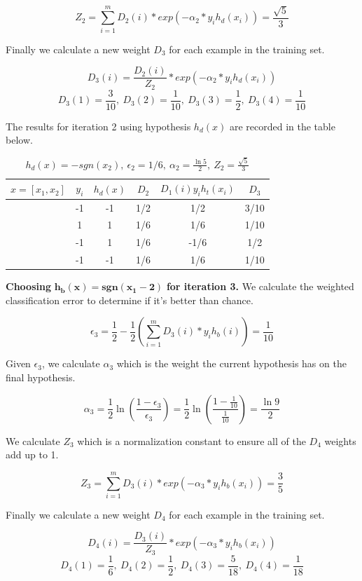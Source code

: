\documentclass[11pt]{article}
\begin{document}
$$Z_2 = \sum_{i = 1}^m D_2(i) * exp(-\alpha_2 * y_ih_d(x_i)) = \frac{\sqrt{5}}{3}$$

Finally we calculate a new weight $D_3$ for each example in the training set.

$$D_{3}(i) = \frac{D_2(i)}{Z_2} * exp(-\alpha_2 * y_ih_d(x_i))$$
$$D_3(1) = \frac{3}{10}, \ D_3(2) = \frac{1}{10}, \ D_3(3) = \frac{1}{2}, \ D_3(4) = \frac{1}{10} $$

The results for iteration 2 using hypothesis $h_d(x)$ are recorded in the table below.

\begin{table}[H]
\centering
{\renewcommand{\arraystretch}{1.2}%
\begin{tabular}{| c | c | c | c | c | c |}
\hline
$x = [x_1, x_2]$& $y_i$ & $h_d(x)$ & $D_2$ & $D_1(i)y_ih_t(x_i)$ & $D_3$\\
\hline
[1,1] & -1 & -1 & 1/2 &  1/2& 3/10\\ \hline
[1,-1] & 1 &  1&  1/6&  1/6& 1/10\\ \hline
[-1,-1] & -1 & 1 & 1/6&  -1/6& 1/2\\ \hline
[-1,1] & -1 & -1 &  1/6&  1/6& 1/10\\ \hline
\end{tabular}}
\caption{$h_d(x) = -sgn(x_2), \ \epsilon_2 = 1/6, \ \alpha_2 = \frac{\ln5}{2}, \ Z_2 = \frac{\sqrt{5}}{3}$}
\end{table}

\textbf{Choosing} $\mathbf{h_b(x) = sgn(x_1 - 2)}$ \textbf{for iteration 3.} We calculate the weighted classification error to determine if it's better than chance.

$$\epsilon_3 = \frac{1}{2} - \frac{1}{2}(\sum_{i=1}^m D_3(i)*y_ih_b(i)) = \frac{1}{10}$$

Given $\epsilon_3$, we calculate $\alpha_3$ which is the weight the current hypothesis has on the final hypothesis.

$$\alpha_3 = \frac{1}{2}\ln(\frac{1 - \epsilon_3}{\epsilon_3}) = \frac{1}{2}\ln(\frac{1 - \frac{1}{10}}{\frac{1}{10}}) = \frac{\ln9}{2}$$

We calculate $Z_3$ which is a normalization constant to ensure all of the $D_4$ weights add up to 1.

$$Z_3 = \sum_{i = 1}^m D_3(i) * exp(-\alpha_3 * y_ih_b(x_i)) = \frac{3}{5}$$

Finally we calculate a new weight $D_4$ for each example in the training set.

$$D_{4}(i) = \frac{D_3(i)}{Z_3} * exp(-\alpha_3 * y_ih_b(x_i))$$
$$D_4(1) = \frac{1}{6}, \ D_4(2) = \frac{1}{2}, \ D_4(3) = \frac{5}{18}, \ D_4(4) = \frac{1}{18} $$
\end{document}
